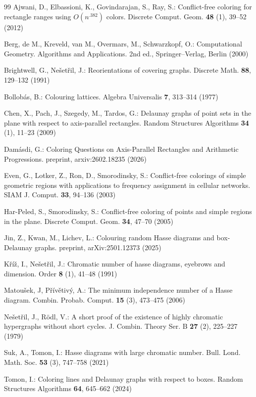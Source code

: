\documentclass[11pt]{article}
\theoremstyle{definition}
\begin{document}
\begin{thebibliography}{99}
\setlength{\itemsep}{0pt}  %
\setlength{\parsep}{0pt}
    Ajwani, D., Elbassioni, K., Govindarajan, S., Ray, S.:
    Conflict-free coloring for rectangle ranges using $O(n^{.382})$ colors.
    Discrete Comput. Geom. {\bf 48} (1), 39--52 (2012)

    Berg, de M., Kreveld, van M., Overmars, M., Schwarzkopf, O.:
    Computational Geometry. 
    Algorithms and Applications. 2nd ed., Springer–Verlag, Berlin (2000)

    Brightwell, G., Ne\v{s}et\v{r}il, J.:
    Reorientations of covering graphs.
    Discrete Math. {\bf 88}, 129--132 (1991)
    
    Bollob\'as, B.:
    Colouring lattices.
    Algebra Universalis {\bf 7}, 313--314  (1977)

    Chen, X., Pach, J., Szegedy, M., Tardos, G.:
    Delaunay graphs of point sets in the plane with respect to axis-parallel rectangles.
    Random Structures Algorithms {\bf 34} (1), 11--23 (2009)

    Dam\'asdi, G.:
    Coloring Questions on Axis-Parallel Rectangles and Arithmetic Progressions.
    preprint, arxiv:2602.18235 (2026)

    Even, G., Lotker, Z., Ron, D., Smorodinsky, S.: 
    Conflict-free colorings of simple geometric regions with applications to frequency assignment in cellular networks.
    SIAM J. Comput. {\bf 33}, 94--136 (2003)

    Har-Peled, S., Smorodinsky, S.: 
    Conflict-free coloring of points and simple regions in the plane.
    Discrete Comput. Geom. {\bf 34}, 47--70 (2005)

    Jin, Z., Kwan, M., Lichev, L.:
    Colouring random Hasse diagrams and box-Delaunay graphs.
    preprint, arXiv:2501.12373 (2025)

    K\v{r}\'i\v{z}, I., Ne\v{s}et\v{r}il, J.:
    Chromatic number of hasse diagrams, eyebrows and dimension. 
    Order {\bf 8} (1), 41--48 (1991)

    Matou\v{s}ek, J, P\v{r}\'iv\v{e}tiv\'y, A.:
    The minimum independence number of a Hasse diagram.
    Combin. Probab. Comput. {\bf 15} (3), 473--475 (2006)

    Ne\v{s}et\v{r}il, J., R\"odl, V.:
    A short proof of the existence of highly chromatic hypergraphs without short cycles.
    J. Combin. Theory Ser. B {\bf 27} (2), 225--227 (1979)

    Suk, A., Tomon, I.:
    Hasse diagrams with large chromatic number.
    Bull. Lond. Math. Soc. {\bf 53} (3), 747--758 (2021)

    Tomon, I.:
    Coloring lines and Delaunay graphs with respect to boxes.
    Random Structures  Algorithms {\bf 64}, 645--662 (2024)
\end{thebibliography}
\end{document}
